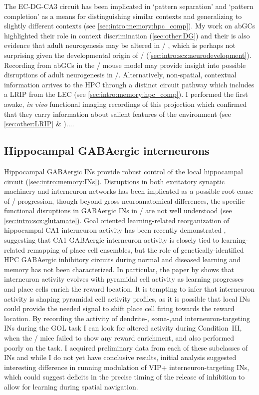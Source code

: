 The EC-DG-CA3 circuit has been implicated in `pattern separation' and `pattern completion'  as a means for distinguishing similar contexts and generalizing to slightly different contexts (see \autoref{sec:intro:memory:hpc_comp}).
My work on \ac{abGCs} highlighted their role in context discrimination (\autoref{sec:other:DG}) and their is also evidence that adult neurogenesis may be altered in \scz/ \citep[reviewed in,][]{Toro2007}, which is perhaps not surprising given the developmental origin of \scz/ (\autoref{sec:intro:scz:neurodevelopment}).
Recording from \ac{abGCs} in the \df/ mouse model may provide insight into possible disruptions of adult neurogenesis in \scz/.
Alternatively, non-spatial, contextual information arrives to the \ac{HPC} through a distinct circuit pathway which includes a \ac{LRIP} from the \ac{LEC} (see \autoref{sec:intro:memory:hpc_comp}).
I performed the first awake, \emph{in vivo} functional imaging recordings of this projection which confirmed that they carry information about salient features of the environment (see \autoref{sec:other:LRIP} \& \citet{Basu2016})....

\subsection{Hippocampal GABAergic interneurons}
Hippocampal GABAergic \ac{INs} provide robust control of the local hippocampal circuit (\autoref{sec:intro:memory:INs}).
Disruptions in both excitatory synaptic machinery and interneuron networks has been implicated as a possible root cause of \scz/ progression, though beyond gross neuroanatomical differences, the specific functional disruptions in GABAergic \ac{INs} in \scz/ are not well understood (see \autoref{sec:intro:scz:glutamate}).
Goal oriented learning-related reorganization of hippocampal CA1 interneuron activity has been recently demonstrated \citep{Dupret2013}, suggesting that CA1 GABAergic interneuron activity is closely tied to learning-related remapping of place cell ensembles, but the role of genetically-identified \ac{HPC} GABAergic inhibitory circuits during normal and diseased learning and memory has not been characterized.
In particular, the paper by \citeauthor{Dupret2013} shows that interneuron activity evolves with pyramidal cell activity as learning progresses and place cells enrich the reward location.
It is tempting to infer that interneuron activity is shaping pyramidal cell activity profiles, as it is possible that local \ac{INs} could provide the needed signal to shift place cell firing towards the reward location.
By recording the activity of dendrite-, soma-,and interneuron-targeting \ac{INs} during the \ac{GOL} task I can look for altered activity during Condition~III, when the \df/ mice failed to show any reward enrichment, and also performed poorly on the task.
I acquired preliminary data from each of these subclasses of \ac{INs} and while I do not yet have conclusive results, initial analysis suggested interesting difference in running modulation of VIP+ interneuron-targeting \ac{INs}, which could suggest deficits in the precise timing of the release of inhibition to allow for learning during spatial navigation.

